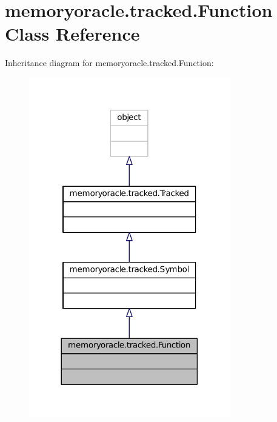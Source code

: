 \hypertarget{classmemoryoracle_1_1tracked_1_1Function}{}\section{memoryoracle.\+tracked.\+Function Class Reference}
\label{classmemoryoracle_1_1tracked_1_1Function}


Inheritance diagram for memoryoracle.\+tracked.\+Function\+:
\nopagebreak
\begin{figure}[H]
\begin{center}
\leavevmode
\includegraphics[width=248pt]{classmemoryoracle_1_1tracked_1_1Function__inherit__graph}
\end{center}
\end{figure}


